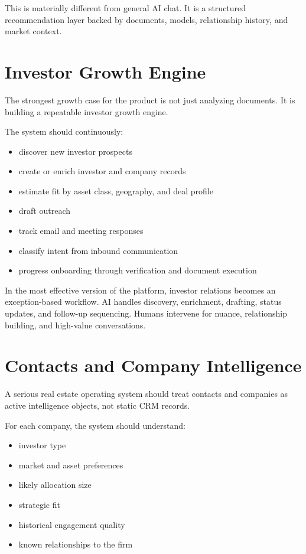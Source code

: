 \documentclass[11pt]{article}
\begin{document}
This is materially different from general AI chat. It is a structured recommendation layer backed by documents, models, relationship history, and market context.

\section{Investor Growth Engine}

The strongest growth case for the product is not just analyzing documents. It is building a repeatable investor growth engine.

The system should continuously:

\begin{itemize}
\item discover new investor prospects
\item create or enrich investor and company records
\item estimate fit by asset class, geography, and deal profile
\item draft outreach
\item track email and meeting responses
\item classify intent from inbound communication
\item progress onboarding through verification and document execution
\end{itemize}

In the most effective version of the platform, investor relations becomes an exception-based workflow. AI handles discovery, enrichment, drafting, status updates, and follow-up sequencing. Humans intervene for nuance, relationship building, and high-value conversations.

\section{Contacts and Company Intelligence}

A serious real estate operating system should treat contacts and companies as active intelligence objects, not static CRM records.

For each company, the system should understand:

\begin{itemize}
\item investor type
\item market and asset preferences
\item likely allocation size
\item strategic fit
\item historical engagement quality
\item known relationships to the firm
\end{itemize}
\end{document}
